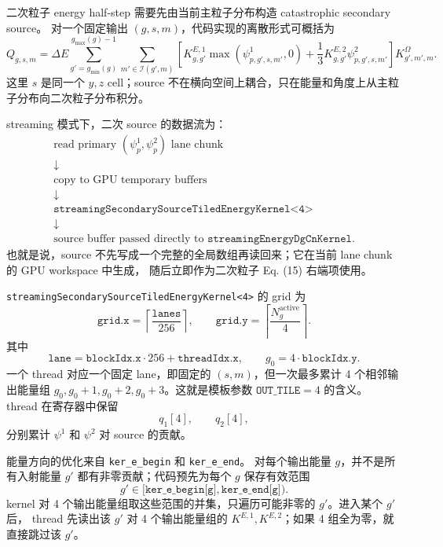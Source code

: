 \documentclass[11pt,a4paper]{ctexart}
\begin{document}
二次粒子 energy half-step 需要先由当前主粒子分布构造 catastrophic secondary source。
对一个固定输出 \((g,s,m)\)，代码实现的离散形式可概括为
\begin{equation}
  Q_{g,s,m}
  =
  \Delta E
  \sum_{g'=g_{\min}(g)}^{g_{\max}(g)-1}
  \sum_{m'\in\mathcal I(g',m)}
  \left[
    K^{E,1}_{g,g'}\max(\psi^1_{p,g',s,m'},0)
    +
    \frac13 K^{E,2}_{g,g'}\psi^2_{p,g',s,m'}
  \right]
  K^\Omega_{g',m',m}.
\end{equation}
这里 \(s\) 是同一个 \(y,z\) cell；source 不在横向空间上耦合，只在能量和角度上从主粒子分布向二次粒子分布积分。

streaming 模式下，二次 source 的数据流为：
\begin{equation}
\begin{array}{c}
\text{read primary }(\psi^1_p,\psi^2_p)\text{ lane chunk}\\
\downarrow\\
\text{copy to GPU temporary buffers}\\
\downarrow\\
\texttt{streamingSecondarySourceTiledEnergyKernel<4>}\\
\downarrow\\
\text{source buffer passed directly to } \texttt{streamingEnergyDgCnKernel}.
\end{array}
\end{equation}
也就是说，source 不先写成一个完整的全局数组再读回来；它在当前 lane chunk 的 GPU workspace 中生成，
随后立即作为二次粒子 Eq. (15) 右端项使用。

\texttt{streamingSecondarySourceTiledEnergyKernel<4>} 的 grid 为
\begin{equation}
  \texttt{grid.x}=\left\lceil\frac{\texttt{lanes}}{256}\right\rceil,\qquad
  \texttt{grid.y}=\left\lceil\frac{N_g^{\mathrm{active}}}{4}\right\rceil.
\end{equation}
其中
\begin{equation}
  \texttt{lane}=\texttt{blockIdx.x}\cdot256+\texttt{threadIdx.x},\qquad
  g_0=4\cdot\texttt{blockIdx.y}.
\end{equation}
一个 thread 对应一个固定 lane，即固定的 \((s,m)\)，但一次最多累计 4 个相邻输出能量组
\(g_0,g_0+1,g_0+2,g_0+3\)。这就是模板参数 \(\texttt{OUT\_TILE}=4\) 的含义。
thread 在寄存器中保留
\begin{equation}
  q_1[4],\qquad q_2[4],
\end{equation}
分别累计 \(\psi^1\) 和 \(\psi^2\) 对 source 的贡献。

能量方向的优化来自 \texttt{ker\_e\_begin} 和 \texttt{ker\_e\_end}。
对每个输出能量 \(g\)，并不是所有入射能量 \(g'\) 都有非零贡献；代码预先为每个 \(g\) 保存有效范围
\begin{equation}
  g'\in
  [\texttt{ker\_e\_begin[g]},\texttt{ker\_e\_end[g]}).
\end{equation}
kernel 对 4 个输出能量组取这些范围的并集，只遍历可能非零的 \(g'\)。进入某个 \(g'\) 后，
thread 先读出该 \(g'\) 对 4 个输出能量组的 \(K^{E,1},K^{E,2}\)；如果 4 组全为零，就直接跳过该
\(g'\)。
\end{document}
